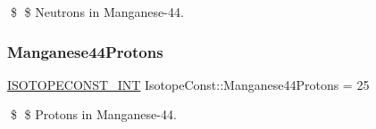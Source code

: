 \$ \$ Neutrons in Manganese-\/44. \mbox{\label{group___isotope_const-_manganese-_mn44_ga535742b8b76d93d78e84b036849c24e7}} 
\subsubsection{\texorpdfstring{Manganese44\+Protons}{Manganese44Protons}}
{\footnotesize\ttfamily \mbox{\hyperlink{group___isotope_const-_macros_ga5f18360b3e99483a35c32d789e62621c}{I\+S\+O\+T\+O\+P\+E\+C\+O\+N\+S\+T\+\_\+\+I\+NT}} Isotope\+Const\+::\+Manganese44\+Protons = 25}

\$ \$ Protons in Manganese-\/44. 